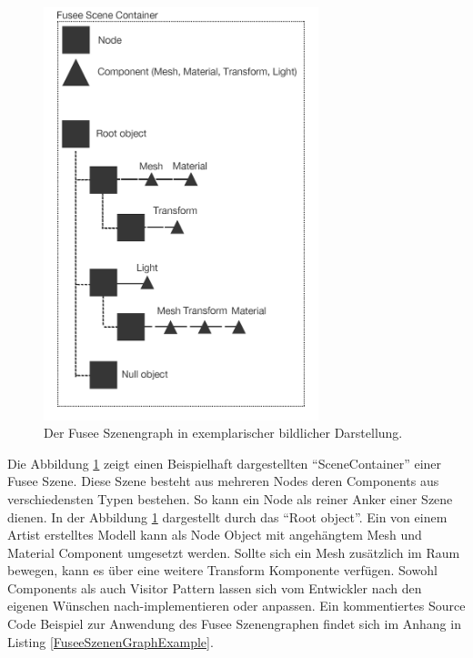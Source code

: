 \documentclass[pagesize, paper=a4, fontsize=12pt, titlepage=true, headings=small, headnosepline, abstractoff, liststotoc, nochapterprefix, plainheadsepline, twoside]{scrreprt}
\begin{document}
\begin{figure}[ht]
	\centering
	\includegraphics[width=8cm]{Bilder/Fusee_Szenengraph_Vgl.jpg}
	\caption{Der Fusee Szenengraph in exemplarischer bildlicher Darstellung.}
	\label{FuseeSzenenGraph}
\end{figure}

Die Abbildung \ref{FuseeSzenenGraph} zeigt einen Beispielhaft dargestellten “SceneContainer” einer Fusee Szene. Diese Szene besteht aus mehreren Nodes deren Components aus verschiedensten Typen bestehen. So kann ein Node als reiner Anker einer Szene dienen. In der Abbildung \ref{FuseeSzenenGraph} dargestellt durch das “Root object”. Ein von einem Artist erstelltes Modell kann als Node Object mit angehängtem Mesh und Material Component umgesetzt werden. Sollte sich ein Mesh zusätzlich im Raum bewegen, kann es über eine weitere Transform Komponente verfügen. Sowohl Components als auch Visitor Pattern lassen sich vom Entwickler nach den eigenen Wünschen nach-implementieren oder anpassen. Ein kommentiertes Source Code Beispiel zur Anwendung des Fusee Szenengraphen findet sich im Anhang in Listing \ref{FuseeSzenenGraphExample}.
\end{document}
